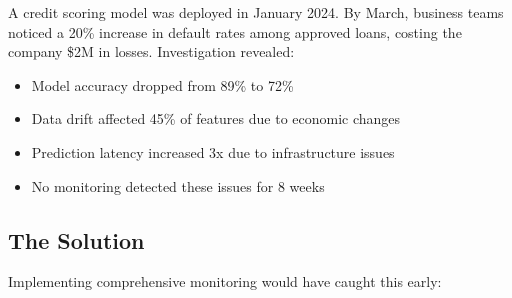 A credit scoring model was deployed in January 2024. By March, business teams noticed a 20\% increase in default rates among approved loans, costing the company \$2M in losses. Investigation revealed:

\begin{itemize}
    \item Model accuracy dropped from 89\% to 72\%
    \item Data drift affected 45\% of features due to economic changes
    \item Prediction latency increased 3x due to infrastructure issues
    \item No monitoring detected these issues for 8 weeks
\end{itemize}

\subsection{The Solution}

Implementing comprehensive monitoring would have caught this early:

